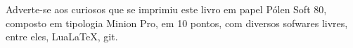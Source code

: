 \pagebreak

\ifodd\thepage\blankpage\fi

\parindent=0pt
\footnotesize\thispagestyle{empty}

\newfontfamily{}

\mbox{}\vfill
\begin{center}
		\begin{minipage}{.7\textwidth}\tiny\noindent{}
		\centering\tiny\minion
		Adverte-se aos curiosos que se imprimiu este 
		livro em papel Pólen Soft 80, composto em tipologia Minion Pro, em 10 pontos, com diversos sofwares livres, 
		entre eles, Lua\LaTeX, git.\\ 
		\medskip\\\
		\end{minipage}
\end{center}
